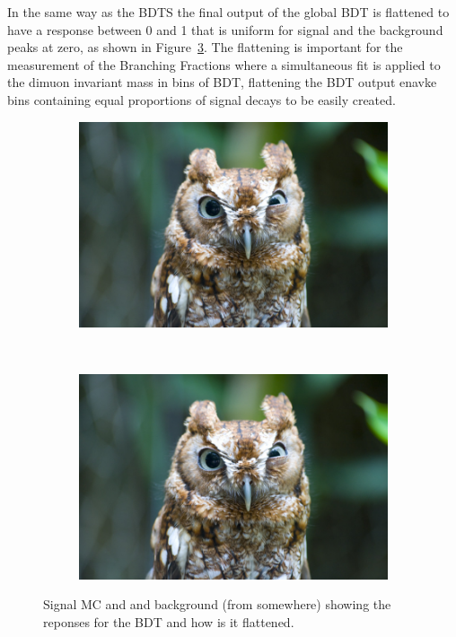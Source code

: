 In the same way as the BDTS the final output of the global BDT is flattened to have a response between 0 and 1 that is uniform for signal and the background peaks at zero, as shown in Figure~\ref{fig:FlatteningBDT}. The flattening is important for the measurement of the \bmumu Branching Fractions where a simultaneous fit is applied to the dimuon invariant mass in bins of BDT, flattening the BDT output enavke bins containing equal proportions of signal decays to be easily created. 


\begin{figure}
    \centering
    \begin{subfigure}[b]{0.4\textwidth}
        \includegraphics[width=\textwidth]{./Figs/placeholder.jpeg}
        \caption{ }
        \label{fig:BDTsig}
    \end{subfigure}
    ~ %
    \begin{subfigure}[b]{0.4\textwidth}
       \includegraphics[width=\textwidth]{./Figs/placeholder.jpeg}
        \caption{ }
        \label{fig:BDTbkg}
    \end{subfigure}
    \caption{Signal MC and and background (from somewhere) showing the reponses for the BDT and how is it flattened.}
    \label{fig:FlatteningBDT}
\end{figure}


